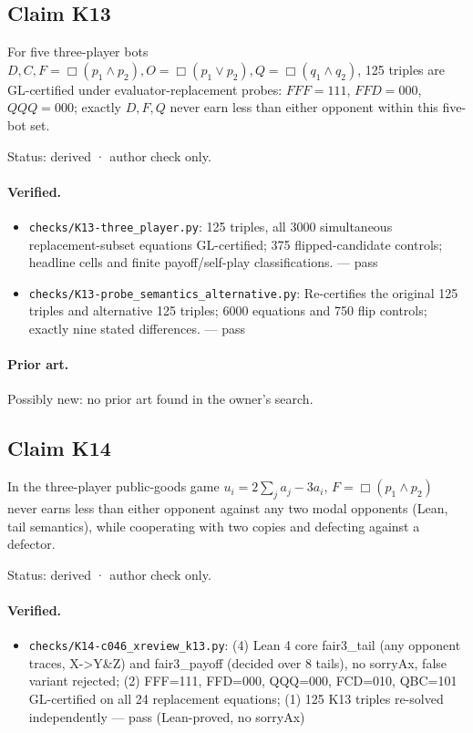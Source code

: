 \documentclass{article}
\begin{document}
\subsection*{Claim K13}

For five three-player bots $D,C,F=\Box(p_1\land p_2),O=\Box(p_1\lor p_2),Q=\Box(q_1\land q_2)$, 125 triples are GL-certified under evaluator-replacement probes: $FFF=111$, $FFD=000$, $QQQ=000$; exactly $D,F,Q$ never earn less than either opponent within this five-bot set.

Status: derived · author check only.

\paragraph{Verified.}
\begin{itemize}
\item \texttt{checks/K13-three\_player.py}: 125 triples, all 3000 simultaneous replacement-subset equations GL-certified; 375 flipped-candidate controls; headline cells and finite payoff/self-play classifications. --- pass
\item \texttt{checks/K13-probe\_semantics\_alternative.py}: Re-certifies the original 125 triples and alternative 125 triples; 6000 equations and 750 flip controls; exactly nine stated differences. --- pass
\end{itemize}

\paragraph{Prior art.} Possibly new: no prior art found in the owner's search.

\subsection*{Claim K14}

In the three-player public-goods game $u_i=2\sum_j a_j-3a_i$, $F=\Box(p_1\land p_2)$ never earns less than either opponent against any two modal opponents (Lean, tail semantics), while cooperating with two copies and defecting against a defector.

Status: derived · author check only.

\paragraph{Verified.}
\begin{itemize}
\item \texttt{checks/K14-c046\_xreview\_k13.py}: (4) Lean 4 core fair3\_tail (any opponent traces, X-\textgreater{}Y\&Z) and fair3\_payoff (decided over 8 tails), no sorryAx, false variant rejected; (2) FFF=111, FFD=000, QQQ=000, FCD=010, QBC=101 GL-certified on all 24 replacement equations; (1) 125 K13 triples re-solved independently --- pass (Lean-proved, no sorryAx)
\end{itemize}
\end{document}
